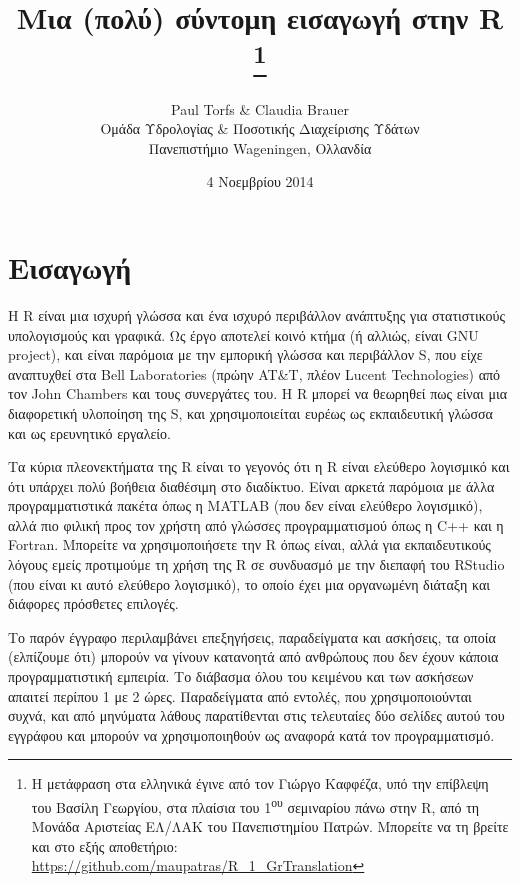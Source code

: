 \documentclass[a4paper,10pt,twocolumn]{article}
\title{\vspace{-13mm} \textbf{Μια (πολύ) σύντομη εισαγωγή στην R}
\footnote{Η μετάφραση στα ελληνικά έγινε από τον Γιώργο Καφφέζα, υπό την επίβλεψη του Βασίλη Γεωργίου, στα
πλαίσια του 1\textsuperscript{ου} σεμιναρίου πάνω στην R, από τη Μονάδα Αριστείας ΕΛ/ΛΑΚ του Πανεπιστημίου
Πατρών. Μπορείτε να τη βρείτε και στο εξής αποθετήριο: \url{https://github.com/maupatras/R_1_GrTranslation}}}
\author{Paul Torfs \& Claudia Brauer\\
\small{Ομάδα Υδρολογίας \& Ποσοτικής Διαχείρισης Υδάτων}\\
\small{Πανεπιστήμιο Wageningen, Ολλανδία}}
\date{\small{4 Νοεμβρίου 2014}}
\begin{document}
\maketitle


\section{Εισαγωγή}

Η R είναι μια ισχυρή γλώσσα και ένα ισχυρό περιβάλλον ανάπτυξης για στατιστικούς
υπολογισμούς και γραφικά. Ως έργο αποτελεί κοινό κτήμα (ή αλλιώς, είναι GNU project),
και είναι παρόμοια με την εμπορική γλώσσα και περιβάλλον S, που είχε αναπτυχθεί στα Bell 
Laboratories (πρώην AT\&T, πλέον Lucent Technologies) από τον John Chambers και τους συνεργάτες
του. Η R μπορεί να θεωρηθεί πως είναι μια διαφορετική υλοποίηση της S, και χρησιμοποιείται ευρέως
ως εκπαιδευτική γλώσσα και ως ερευνητικό εργαλείο.

Τα κύρια πλεονεκτήματα της R είναι το γεγονός ότι η R είναι ελεύθερο λογισμικό και ότι υπάρχει
πολύ βοήθεια διαθέσιμη στο διαδίκτυο. Είναι αρκετά παρόμοια με άλλα προγραμματιστικά πακέτα όπως 
η MATLAB (που δεν είναι ελεύθερο λογισμικό), αλλά πιο φιλική προς τον χρήστη από γλώσσες
προγραμματισμού όπως η C++ και η Fortran. Μπορείτε να χρησιμοποιήσετε την R όπως είναι, αλλά για
εκπαιδευτικούς λόγους εμείς προτιμούμε τη χρήση της R σε συνδυασμό με την διεπαφή του RStudio
(που είναι κι αυτό ελεύθερο λογισμικό), το οποίο έχει μια οργανωμένη διάταξη και διάφορες πρόσθετες
επιλογές.

Το παρόν έγγραφο περιλαμβάνει επεξηγήσεις, παραδείγματα και ασκήσεις, τα οποία (ελπίζουμε ότι)
μπορούν να γίνουν κατανοητά από ανθρώπους που δεν έχουν κάποια προγραμματιστική εμπειρία. Το διάβασμα
όλου του κειμένου και των ασκήσεων απαιτεί περίπου 1 με 2 ώρες. Παραδείγματα από εντολές, που 
χρησιμοποιούνται συχνά, και από μηνύματα λάθους παρατίθενται στις τελευταίες δύο σελίδες αυτού
του εγγράφου και μπορούν να χρησιμοποιηθούν ως αναφορά κατά τον προγραμματισμό.


\end{document}

